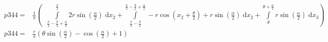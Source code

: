 \begin{align}
    p344 =&\frac{1}{\pi} \left(\;\;\int\limits_{\frac{\pi}{2} - \frac{\theta}{2} + \frac{\alpha}{2}}^{\frac{\pi}{2}}2 r \sin{\left (\frac{\alpha}{2} \right )}\;\mathrm{d}x_{2}+\int\limits_{\frac{\pi}{2} - \frac{\theta}{2}}^{\frac{\pi}{2} - \frac{\theta}{2} + \frac{\alpha}{2}}- r \cos{\left (x_{2} + \frac{\theta}{2} \right )} + r \sin{\left (\frac{\alpha}{2} \right )}\;\mathrm{d}x_{2}+\int\limits_{\theta}^{\theta + \frac{\alpha}{2}}r \sin{\left (\frac{\alpha}{2} \right )}\;\mathrm{d}x_{3}\right)\label{p344Def}\\
    p344 =& \frac{r}{\pi} \left(\theta \sin{\left (\frac{\alpha}{2} \right )} - \cos{\left (\frac{\alpha}{2} \right )} + 1\right)\label{p344Sln}
\end{align}